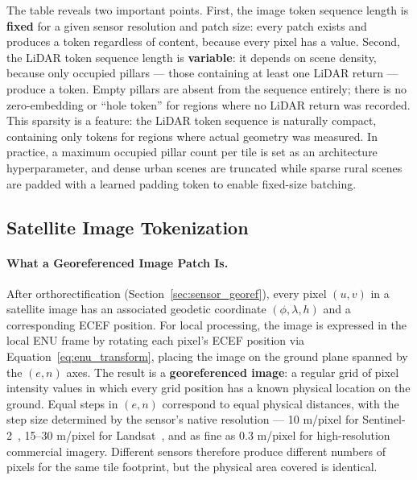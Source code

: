 \documentclass{book}
\begin{document}
The table reveals two important points.  First, the image token
sequence length is \textbf{fixed} for a given sensor resolution and
patch size: every patch exists and produces a token regardless of
content, because every pixel has a value.  Second, the LiDAR token
sequence length is \textbf{variable}: it depends on scene density,
because only occupied pillars --- those containing at least one LiDAR
return --- produce a token.  Empty pillars are absent from the
sequence entirely; there is no zero-embedding or ``hole token'' for
regions where no LiDAR return was recorded.  This sparsity is a
feature: the LiDAR token sequence is naturally compact, containing
only tokens for regions where actual geometry was measured.  In
practice, a maximum occupied pillar count per tile is set as an
architecture hyperparameter, and dense urban scenes are truncated
while sparse rural scenes are padded with a learned padding token to
enable fixed-size batching.

\subsection{Satellite Image Tokenization}
\label{sec:img_tokenization}

\paragraph{What a Georeferenced Image Patch Is.}

After orthorectification (Section~\ref{sec:sensor_georef}), every
pixel $(u, v)$ in a satellite image has an associated geodetic
coordinate $(\phi, \lambda, h)$ and a corresponding ECEF position.
For local processing, the image is expressed in the local ENU frame
by rotating each pixel's ECEF position via
Equation~\eqref{eq:enu_transform}, placing the image on the ground
plane spanned by the $(e, n)$ axes.  The result is a
\textbf{georeferenced image}: a regular grid of pixel intensity
values in which every grid position has a known physical location on
the ground.  Equal steps in $(e, n)$ correspond to equal physical
distances, with the step size determined by the sensor's native
resolution --- 10 m/pixel for Sentinel-2~\cite{drusch2012sentinel},
15--30 m/pixel for Landsat~\cite{wulder2022landsat}, and as fine as
0.3 m/pixel for high-resolution commercial imagery.  Different
sensors therefore produce different numbers of pixels for the same
tile footprint, but the physical area covered is identical.
\end{document}
